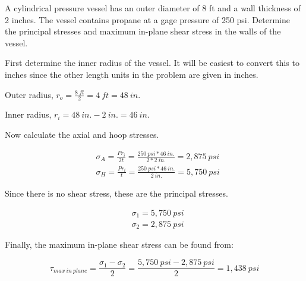 \documentclass[
  letterpaper,
  DIV=11,
  numbers=noendperiod]{scrreprt}
\theoremstyle{definition}
\theoremstyle{remark}
\begin{document}
\begin{tcolorbox}[enhanced jigsaw, leftrule=.75mm, colbacktitle=quarto-callout-tip-color!10!white, breakable, opacityback=0, colback=white, titlerule=0mm, toprule=.15mm, colframe=quarto-callout-tip-color-frame, coltitle=black, title={Example 13.1}, toptitle=1mm, bottomrule=.15mm, rightrule=.15mm, left=2mm, arc=.35mm, opacitybacktitle=0.6, bottomtitle=1mm]

A cylindrical pressure vessel has an outer diameter of 8 ft and a wall
thickness of 2 inches. The vessel contains propane at a gage pressure of
250 psi. Determine the principal stresses and maximum in-plane shear
stress in the walls of the vessel.

\begin{tcolorbox}[enhanced jigsaw, leftrule=.75mm, colbacktitle=quarto-callout-tip-color!10!white, breakable, opacityback=0, colback=white, titlerule=0mm, toprule=.15mm, colframe=quarto-callout-tip-color-frame, coltitle=black, title={Solution}, toptitle=1mm, bottomrule=.15mm, rightrule=.15mm, left=2mm, arc=.35mm, opacitybacktitle=0.6, bottomtitle=1mm]

First determine the inner radius of the vessel. It will be easiest to
convert this to inches since the other length units in the problem are
given in inches.

Outer radius, \(r_o = \frac{8{~ft}}{2} = 4 {~ft} = 48{~in.}\)

Inner radius, \(r_i = 48{~in.} - 2{~in.} = 46{~in.}\)

Now calculate the axial and hoop stresses.

\[
\begin{aligned}
& \sigma_A=\frac{Pr_i}{2t}=\frac{250{~psi} * 46{~in.}}{2 * 2{~in.}}=2,875{~psi} \\
& \sigma_H=\frac{Pr_i}{t}=\frac{250{~psi} * 46{~in.}}{2{~in.}}=5,750{~psi}
\end{aligned}
\]

Since there is no shear stress, these are the principal stresses.

\[
\begin{aligned}
& \sigma_1=5,750{~psi} \\
& \sigma_2=2,875{~psi}
\end{aligned}
\]

Finally, the maximum in-plane shear stress can be found from:

\[
\tau_{max~in~plane}=\frac{\sigma_1-\sigma_2}{2}=\frac{5,750{~psi}-2,875{~psi}}{2}=1,438{~psi}
\]

\end{tcolorbox}

\end{tcolorbox}
\end{document}

